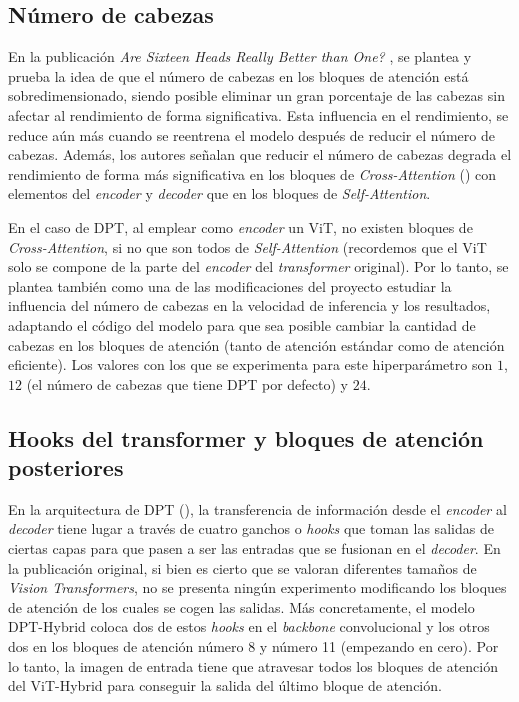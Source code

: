 \subsection{Número de cabezas}
En la publicación \textit{Are Sixteen Heads Really Better than One?} \cite{are16headsbetterthan1}, se plantea y prueba la idea de que el número de cabezas en los bloques de atención está sobredimensionado, siendo posible eliminar un gran porcentaje de las cabezas sin afectar al rendimiento de forma significativa. Esta influencia en el rendimiento, se reduce aún más cuando se reentrena el modelo después de reducir el número de cabezas.  Además, los autores señalan que reducir el número de cabezas degrada el rendimiento de forma más significativa en los bloques de \textit{Cross-Attention} () con elementos del \textit{encoder} y \textit{decoder} que en los bloques de \textit{Self-Attention}. 

En el caso de DPT, al emplear como \textit{encoder} un ViT, no existen bloques de \textit{Cross-Attention}, si no que son todos de \textit{Self-Attention} (recordemos que el ViT solo se compone de la parte del \textit{encoder} del \textit{transformer} original). Por lo tanto, se plantea también como una de las modificaciones del proyecto estudiar la influencia del número de cabezas en la velocidad de inferencia y los resultados, adaptando el código del modelo para que sea posible cambiar la cantidad de cabezas en los bloques de atención (tanto de atención estándar como de atención eficiente). Los valores con los que se experimenta para este hiperparámetro son $1$, $12$ (el número de cabezas que tiene DPT por defecto) y $24$.

\subsection{Hooks del transformer y bloques de atención posteriores}

En la arquitectura de DPT (), la transferencia de información desde el \textit{encoder} al \textit{decoder} tiene lugar a través de cuatro ganchos o \textit{hooks} que toman las salidas de ciertas capas para que pasen a ser las entradas que se fusionan en el \textit{decoder}. En la publicación original, si bien es cierto que se valoran diferentes tamaños de \textit{Vision Transformers}, no se presenta ningún experimento modificando los bloques de atención de los cuales se cogen las salidas. Más concretamente, el modelo DPT-Hybrid coloca dos de estos \textit{hooks} en el \textit{backbone} convolucional y los otros dos en los bloques de atención número 8 y número 11 (empezando en cero). Por lo tanto, la imagen de entrada tiene que atravesar todos los bloques de atención del ViT-Hybrid para conseguir la salida del último bloque de atención.

